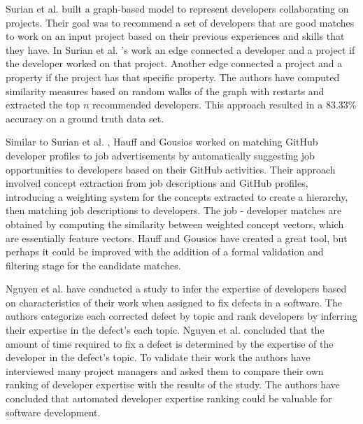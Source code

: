         Surian et al. \cite{surian2011recommending} built a graph-based model to represent developers collaborating on projects. Their goal was to recommend a set of developers that are good matches to work on an input project based on their previous experiences and skills that they have. In Surian et al. \cite{surian2011recommending}'s work an edge connected a developer and a project if the developer worked on that project. Another edge connected a project and a property if the project has that specific property. The authors have computed similarity measures based on random walks of the graph with restarts and extracted the top $n$ recommended developers. This approach resulted in a 83.33\% accuracy on a ground truth data set.
        
        Similar to Surian et al. \cite{surian2011recommending}, Hauff and Gousios \cite{hauff2015matching} worked on matching GitHub developer profiles to job advertisements by automatically suggesting job opportunities to developers based on their GitHub activities. Their approach involved concept extraction from job descriptions and GitHub profiles, introducing a weighting system for the concepts extracted to create a hierarchy, then matching job descriptions to developers. The job - developer matches are obtained by computing the similarity between weighted concept vectors, which are essentially feature vectors. Hauff and Gousios have created a great tool, but perhaps it could be improved with the addition of a formal validation and filtering stage for the candidate matches.

        Nguyen et al. \cite{nguyen2012inferring} have conducted a study to infer the expertise of developers based on characteristics of their work when assigned to fix defects in a software. The authors categorize each corrected defect by topic and rank developers by inferring their expertise in the defect’s each topic. Nguyen et al. concluded that the amount of time required to fix a defect is determined by the expertise of the developer in the defect’s topic. To validate their work the authors have interviewed many project managers and asked them to compare their own ranking of developer expertise with the results of the study. The authors have concluded that automated developer expertise ranking could be valuable for software development. 
        

